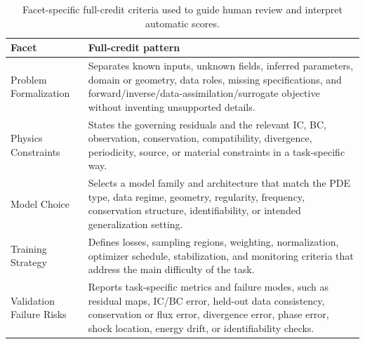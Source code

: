 \documentclass[11pt]{article}
\begin{document}
\begin{table}[t]
\caption{Facet-specific full-credit criteria used to guide human review and interpret automatic scores.}
\label{tab:appendix-facet-full-credit}
\centering
\small
\begin{tabularx}{\textwidth}{@{}p{}X@{}}
\toprule
\textbf{Facet} & \textbf{Full-credit pattern} \\
\midrule
Problem Formalization & Separates known inputs, unknown fields, inferred parameters, domain or geometry, data roles, missing specifications, and forward/inverse/data-assimilation/surrogate objective without inventing unsupported details. \\
Physics Constraints & States the governing residuals and the relevant IC, BC, observation, conservation, compatibility, divergence, periodicity, source, or material constraints in a task-specific way. \\
Model Choice & Selects a model family and architecture that match the PDE type, data regime, geometry, regularity, frequency, conservation structure, identifiability, or intended generalization setting. \\
Training Strategy & Defines losses, sampling regions, weighting, normalization, optimizer schedule, stabilization, and monitoring criteria that address the main difficulty of the task. \\
Validation Failure Risks & Reports task-specific metrics and failure modes, such as residual maps, IC/BC error, held-out data consistency, conservation or flux error, divergence error, phase error, shock location, energy drift, or identifiability checks. \\
\bottomrule
\end{tabularx}
\end{table}
\end{document}
